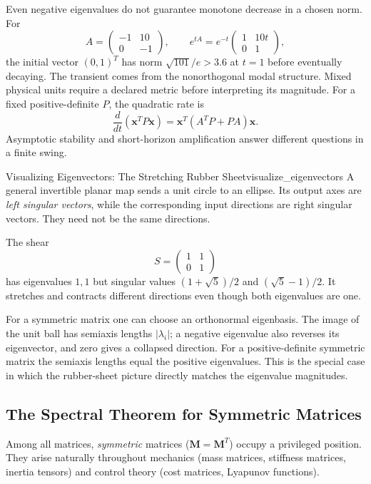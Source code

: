 Even negative eigenvalues do not guarantee monotone decrease in a chosen norm. For
\[
A=\begin{pmatrix}-1&10\\0&-1\end{pmatrix},
\qquad
e^{tA}=e^{-t}\begin{pmatrix}1&10t\\0&1\end{pmatrix},
\]
the initial vector $(0,1)^T$ has norm $\sqrt{101}/e>3.6$ at $t=1$ before eventually decaying. The transient comes from the nonorthogonal modal structure. Mixed physical units require a declared metric before interpreting its magnitude. For a fixed positive-definite $P$, the quadratic rate is
\[
\frac{d}{dt}(\mathbf x^TP\mathbf x)
=\mathbf x^T(A^TP+PA)\mathbf x.
\]
Asymptotic stability and short-horizon amplification answer different questions in a finite swing.

\begin{example}{Visualizing Eigenvectors: The Stretching Rubber Sheet}{visualize_eigenvectors}
A general invertible planar map sends a unit circle to an ellipse. Its output axes are \emph{left singular vectors}, while the corresponding input directions are right singular vectors. They need not be the same directions.

The shear
\[
S=\begin{pmatrix}1&1\\0&1\end{pmatrix}
\]
has eigenvalues $1,1$ but singular values $(1+\sqrt5)/2$ and $(\sqrt5-1)/2$. It stretches and contracts different directions even though both eigenvalues are one.

For a symmetric matrix one can choose an orthonormal eigenbasis. The image of the unit ball has semiaxis lengths $|\lambda_i|$; a negative eigenvalue also reverses its eigenvector, and zero gives a collapsed direction. For a positive-definite symmetric matrix the semiaxis lengths equal the positive eigenvalues. This is the special case in which the rubber-sheet picture directly matches the eigenvalue magnitudes.

\end{example}

\subsection{The Spectral Theorem for Symmetric Matrices}
\label{subsec:spectral_theorem}

Among all matrices, \emph{symmetric} matrices ($\mathbf{M} = \mathbf{M}^T$) occupy a privileged position. They arise naturally throughout mechanics (mass matrices, stiffness matrices, inertia tensors) and control theory (cost matrices, Lyapunov functions).

